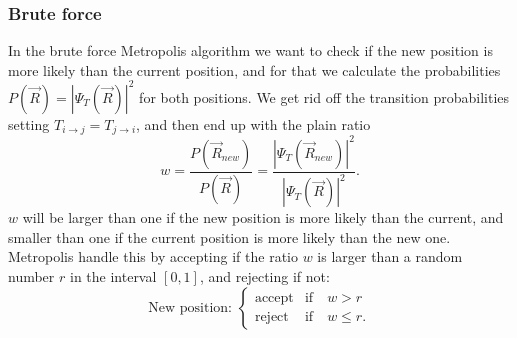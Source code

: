 \documentclass[norsk,a4paper,12pt]{article}
\begin{document}
\subsubsection{Brute force}
In the brute force Metropolis algorithm we want to check if the new position is more likely than the current position, and for that we calculate the probabilities $P(\vec{R})=|\Psi_T(\vec{R})|^2$ for both positions. We get rid off the transition probabilities setting $T_{i\rightarrow j}=T_{j\rightarrow i}$, and then end up with the plain ratio
\begin{equation}
w=\frac{P(\vec{R}_{new})}{P(\vec{R})}=\frac{|\Psi_T(\vec{R}_{new})|^2}{|\Psi_T(\vec{R})|^2}.
\end{equation}
$w$ will be larger than one if the new position is more likely than the current, and smaller than one if the current position is more likely than the new one. Metropolis handle this by accepting if the ratio $w$ is larger than a random number $r$ in the interval $[0,1]$, and rejecting if not:
\begin{equation}
\text{New position: }
\begin{cases} 
   \text{accept} & \text{if}\quad w > r \\
   \text{reject} & \text{if}\quad w \leq r.
\end{cases}
\end{equation}
\end{document}
